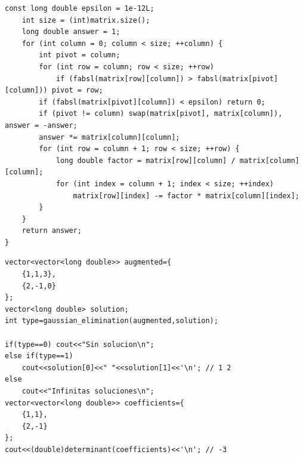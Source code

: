 \begin{lstlisting}[style=cpp]
    const long double epsilon = 1e-12L;
    int size = (int)matrix.size();
    long double answer = 1;
    for (int column = 0; column < size; ++column) {
        int pivot = column;
        for (int row = column; row < size; ++row)
            if (fabsl(matrix[row][column]) > fabsl(matrix[pivot][column])) pivot = row;
        if (fabsl(matrix[pivot][column]) < epsilon) return 0;
        if (pivot != column) swap(matrix[pivot], matrix[column]), answer = -answer;
        answer *= matrix[column][column];
        for (int row = column + 1; row < size; ++row) {
            long double factor = matrix[row][column] / matrix[column][column];
            for (int index = column + 1; index < size; ++index)
                matrix[row][index] -= factor * matrix[column][index];
        }
    }
    return answer;
}
\end{lstlisting}
\begin{lstlisting}[style=cpp]
vector<vector<long double>> augmented={
    {1,1,3},
    {2,-1,0}
};
vector<long double> solution;
int type=gaussian_elimination(augmented,solution);

if(type==0) cout<<"Sin solucion\n";
else if(type==1)
    cout<<solution[0]<<" "<<solution[1]<<'\n'; // 1 2
else
    cout<<"Infinitas soluciones\n";
vector<vector<long double>> coefficients={
    {1,1},
    {2,-1}
};
cout<<(double)determinant(coefficients)<<'\n'; // -3
\end{lstlisting}
